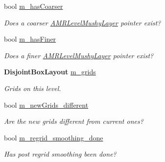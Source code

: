 \begin{DoxyCompactItemize}
bool \hyperlink{class_a_m_r_level_mushy_layer_a3b035a45d271c4c771406dc0f181d44e}{m\+\_\+has\+Coarser}
\begin{DoxyCompactList}\small\item\em Does a coarser \hyperlink{class_a_m_r_level_mushy_layer}{A\+M\+R\+Level\+Mushy\+Layer} pointer exist? \end{DoxyCompactList}\item 
\mbox{\label{class_a_m_r_level_mushy_layer_a4ae86c69a9100a32c7cc278100a534ee}} 
bool \hyperlink{class_a_m_r_level_mushy_layer_a4ae86c69a9100a32c7cc278100a534ee}{m\+\_\+has\+Finer}
\begin{DoxyCompactList}\small\item\em Does a finer \hyperlink{class_a_m_r_level_mushy_layer}{A\+M\+R\+Level\+Mushy\+Layer} pointer exist? \end{DoxyCompactList}\item 
\mbox{\label{class_a_m_r_level_mushy_layer_a1099c89fd5bc80bf46eea1823a0d3ae3}} 
\textbf{ Disjoint\+Box\+Layout} \hyperlink{class_a_m_r_level_mushy_layer_a1099c89fd5bc80bf46eea1823a0d3ae3}{m\+\_\+grids}
\begin{DoxyCompactList}\small\item\em Grids on this level. \end{DoxyCompactList}\item 
\mbox{\label{class_a_m_r_level_mushy_layer_a8eec8d2d864c28268839fd35d1788cb4}} 
bool \hyperlink{class_a_m_r_level_mushy_layer_a8eec8d2d864c28268839fd35d1788cb4}{m\+\_\+new\+Grids\+\_\+different}
\begin{DoxyCompactList}\small\item\em Are the new grids different from current ones? \end{DoxyCompactList}\item 
\mbox{\label{class_a_m_r_level_mushy_layer_a4c79c5e47b397340a7e682026e1a2081}} 
bool \hyperlink{class_a_m_r_level_mushy_layer_a4c79c5e47b397340a7e682026e1a2081}{m\+\_\+regrid\+\_\+smoothing\+\_\+done}
\begin{DoxyCompactList}\small\item\em Has post regrid smoothing been done? \end{DoxyCompactList}\item 

\end{DoxyCompactItemize}
